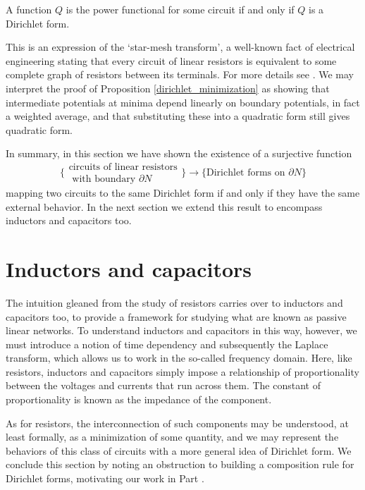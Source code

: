 \begin{proposition}
  A function $Q$ is the power functional for some circuit if and only if $Q$ is a
  Dirichlet form.
\end{proposition}

This is an expression of the `star-mesh transform', a well-known fact of
electrical engineering stating that every circuit of linear resistors is
equivalent to some complete graph of resistors between its terminals. For more
details see \cite{vLO}. We may interpret the proof of Proposition
\ref{dirichlet_minimization} as showing that intermediate potentials at minima
depend linearly on boundary potentials, in fact a weighted average, and that
substituting these into a quadratic form still gives quadratic form.

\bigskip

In summary, in this section we have shown the existence of a surjective function
\[
  \bigg\{\begin{array}{c} \mbox{circuits of linear resistors} \\ \mbox{ with
    boundary $\partial N$} \end{array} \bigg\} \longrightarrow \bigg\{
    \mbox{Dirichlet forms on $\partial N$}\bigg\}
\]
mapping two circuits to the same Dirichlet form if and only if they have the same
external behavior.  In the next section we extend this result to encompass
inductors and capacitors too.


\section{Inductors and capacitors} \label{sec:plcs}
The intuition gleaned from the study of resistors carries over to inductors and
capacitors too, to provide a framework for studying what are known as passive
linear networks. To understand inductors and capacitors in this way, however, we
must introduce a notion of time dependency and subsequently the Laplace
transform, which allows us to work in the so-called frequency domain. Here, like
resistors, inductors and capacitors simply impose a relationship of
proportionality between the voltages and currents that run across them. The
constant of proportionality is known as the impedance of the component.

As for resistors, the interconnection of such components may be understood, at
least formally, as a minimization of some quantity, and we may represent the
behaviors of this class of circuits with a more general idea of Dirichlet form.
We conclude this section by noting an obstruction to building a composition rule
for Dirichlet forms, motivating our work in Part . 


